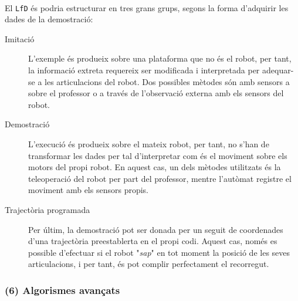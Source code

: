 \documentclass[12pt,a4paper,final,twoside]{article}
\begin{document}
\paragraph{}El \texttt{LfD} és podria estructurar en tres grans grups, segons la forma d'adquirir les dades de la demostració:
\begin{description}

\item[Imitació] L'exemple és produeix sobre una plataforma que no és el robot, per tant, la informació extreta requereix ser modificada i interpretada per adequar-se a les articulacions del robot. Dos possibles mètodes són amb sensors a sobre el professor o a través de l'observació externa amb els sensors del robot.

\item[Demostració] L'execució és produeix sobre el mateix robot, per tant, no s'han de transformar les dades per tal d'interpretar com és el moviment sobre els motors del propi robot. En aquest cas, un dels mètodes utilitzats és la teleoperació del robot per part del professor, mentre l'autòmat registre el moviment amb els sensors propis.

\item[Trajectòria programada] Per últim, la demostració pot ser donada per un seguit de coordenades d'una trajectòria preestablerta en el propi codi. Aquest cas, només es possible d'efectuar si el robot "\textit{sap}" en tot moment la posició de les seves articulacions, i per tant, és pot complir perfectament el recorregut. 

\end{description}

\subsubsection*{(6) Algorismes avançats}
\end{document}
